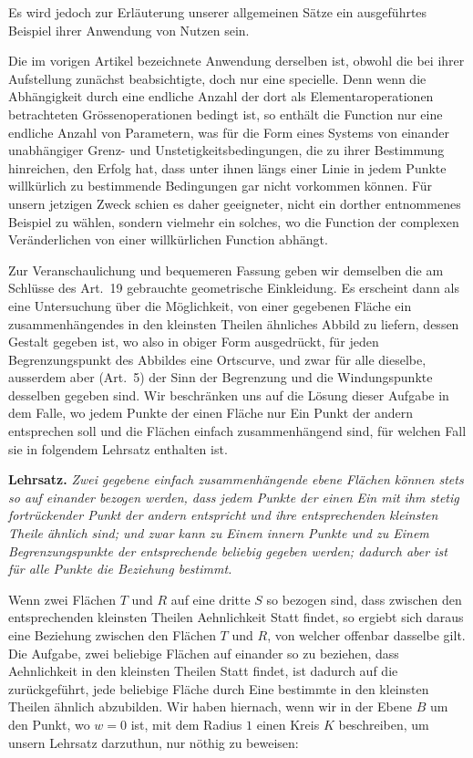 \documentclass[12pt,a4paper]{article}
\begin{document}
Es wird jedoch zur Erläuterung unserer allgemeinen Sätze ein ausgeführtes Beispiel ihrer Anwendung von Nutzen sein.

Die im vorigen Artikel bezeichnete Anwendung derselben ist, obwohl die bei ihrer Aufstellung zunächst beabsichtigte, doch nur eine specielle. Denn wenn die Abhängigkeit durch eine endliche Anzahl der dort als Elementaroperationen betrachteten Grössenoperationen bedingt ist, so enthält die Function nur eine endliche Anzahl von Parametern, was für die Form eines Systems von einander unabhängiger Grenz- und Unstetigkeitsbedingungen, die zu ihrer Bestimmung hinreichen, den Erfolg hat, dass unter ihnen längs einer Linie in jedem Punkte willkürlich zu bestimmende Bedingungen gar nicht vorkommen können. Für unsern jetzigen Zweck schien es daher geeigneter, nicht ein dorther entnommenes Beispiel zu wählen, sondern vielmehr ein solches, wo die Function der complexen Veränderlichen von einer willkürlichen Function abhängt.

Zur Veranschaulichung und bequemeren Fassung geben wir demselben die am Schlüsse des Art.~19 gebrauchte geometrische Einkleidung. Es erscheint dann als eine Untersuchung über die Möglichkeit, von einer gegebenen Fläche ein zusammenhängendes in den kleinsten Theilen ähnliches Abbild zu liefern, dessen Gestalt gegeben ist, wo also in obiger Form ausgedrückt, für jeden Begrenzungspunkt des Abbildes eine Ortscurve, und zwar für alle dieselbe, ausserdem aber (Art.~5) der Sinn der Begrenzung und die Windungspunkte desselben gegeben sind. Wir beschränken uns auf die Lösung dieser Aufgabe in dem Falle, wo jedem Punkte der einen Fläche nur Ein Punkt der andern entsprechen soll und die Flächen einfach zusammenhängend sind, für welchen Fall sie in folgendem Lehrsatz enthalten ist.

\medskip
\noindent\textbf{Lehrsatz.} \textit{Zwei gegebene einfach zusammenhängende ebene Flächen können stets so auf einander bezogen werden, dass jedem Punkte der einen Ein mit ihm stetig fortrückender Punkt der andern entspricht und ihre entsprechenden kleinsten Theile ähnlich sind; und zwar kann zu Einem innern Punkte und zu Einem Begrenzungspunkte der entsprechende beliebig gegeben werden; dadurch aber ist für alle Punkte die Beziehung bestimmt.}
\medskip

Wenn zwei Flächen $T$ und $R$ auf eine dritte $S$ so bezogen sind, dass zwischen den entsprechenden kleinsten Theilen Aehnlichkeit Statt findet, so ergiebt sich daraus eine Beziehung zwischen den Flächen $T$ und $R$, von welcher offenbar dasselbe gilt. Die Aufgabe, zwei beliebige Flächen auf einander so zu beziehen, dass Aehnlichkeit in den kleinsten Theilen Statt findet, ist dadurch auf die zurückgeführt, jede beliebige Fläche durch Eine bestimmte in den kleinsten Theilen ähnlich abzubilden. Wir haben hiernach, wenn wir in der Ebene $B$ um den Punkt, wo $w = 0$ ist, mit dem Radius $1$ einen Kreis $K$ beschreiben, um unsern Lehrsatz darzuthun, nur nöthig zu beweisen:
\end{document}
